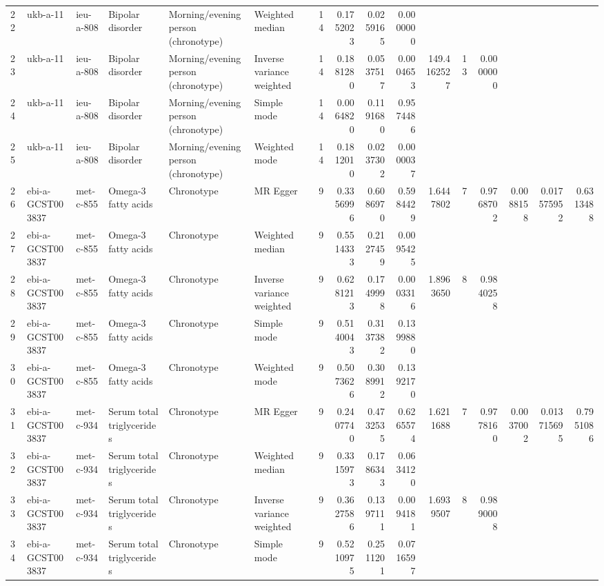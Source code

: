 \begin{table}[ht]
\begin{tabular}{llllllrrrrrrrrrr}
  22 & ukb-a-11 & ieu-a-808 & Bipolar disorder & Morning/evening person (chronotype) & Weighted median & 14 & 0.1752023 & 0.0259165 & 0.0000000 &  &  &  &  &  &  \\ 
  23 & ukb-a-11 & ieu-a-808 & Bipolar disorder & Morning/evening person (chronotype) & Inverse variance weighted & 14 & 0.1881280 & 0.0537517 & 0.0004653 & 149.4162527 & 13 & 0.0000000 &  &  &  \\ 
  24 & ukb-a-11 & ieu-a-808 & Bipolar disorder & Morning/evening person (chronotype) & Simple mode & 14 & 0.0064820 & 0.1191680 & 0.9574486 &  &  &  &  &  &  \\ 
  25 & ukb-a-11 & ieu-a-808 & Bipolar disorder & Morning/evening person (chronotype) & Weighted mode & 14 & 0.1812010 & 0.0237302 & 0.0000037 &  &  &  &  &  &  \\ 
  26 & ebi-a-GCST003837 & met-c-855 & Omega-3 fatty acids & Chronotype & MR Egger & 9 & 0.3356996 & 0.6086970 & 0.5984429 & 1.6447802 & 7 & 0.9768702 & 0.0088158 & 0.017575952 & 0.6313488 \\ 
  27 & ebi-a-GCST003837 & met-c-855 & Omega-3 fatty acids & Chronotype & Weighted median & 9 & 0.5514333 & 0.2127459 & 0.0095425 &  &  &  &  &  &  \\ 
  28 & ebi-a-GCST003837 & met-c-855 & Omega-3 fatty acids & Chronotype & Inverse variance weighted & 9 & 0.6281213 & 0.1749998 & 0.0003316 & 1.8963650 & 8 & 0.9840258 &  &  &  \\ 
  29 & ebi-a-GCST003837 & met-c-855 & Omega-3 fatty acids & Chronotype & Simple mode & 9 & 0.5140043 & 0.3137382 & 0.1399880 &  &  &  &  &  &  \\ 
  30 & ebi-a-GCST003837 & met-c-855 & Omega-3 fatty acids & Chronotype & Weighted mode & 9 & 0.5073626 & 0.3089912 & 0.1392170 &  &  &  &  &  &  \\ 
  31 & ebi-a-GCST003837 & met-c-934 & Serum total triglycerides & Chronotype & MR Egger & 9 & 0.2407740 & 0.4732535 & 0.6265574 & 1.6211688 & 7 & 0.9778160 & 0.0037002 & 0.013715695 & 0.7951086 \\ 
  32 & ebi-a-GCST003837 & met-c-934 & Serum total triglycerides & Chronotype & Weighted median & 9 & 0.3315973 & 0.1786343 & 0.0634120 &  &  &  &  &  &  \\ 
  33 & ebi-a-GCST003837 & met-c-934 & Serum total triglycerides & Chronotype & Inverse variance weighted & 9 & 0.3627586 & 0.1397111 & 0.0094181 & 1.6939507 & 8 & 0.9890008 &  &  &  \\ 
  34 & ebi-a-GCST003837 & met-c-934 & Serum total triglycerides & Chronotype & Simple mode & 9 & 0.5210975 & 0.2511201 & 0.0716597 &  &  &  &  &  &  \\ 

\end{tabular}
\end{table}
